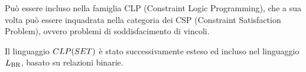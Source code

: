 Può essere incluso nella famiglia CLP (Constraint Logic Programming), che a sua volta può essere inquadrata nella categoria dei CSP (Constraint Satisfaction Problem), ovvero problemi di soddisfacimento di vincoli. 

Il linguaggio $CLP(SET)$ è stato successivamente esteso ed incluso nel linguaggio $L_\mathrm{BR}$, basato su relazioni binarie.


